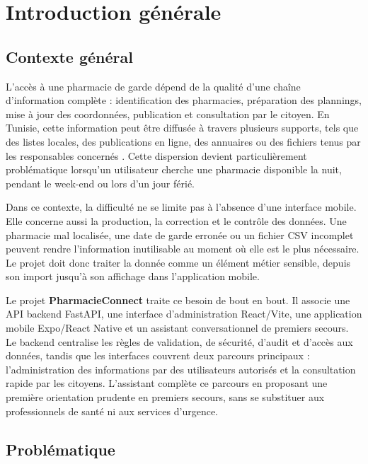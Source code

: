\chapter*{Introduction générale}

\section*{Contexte général}

L'accès à une pharmacie de garde dépend de la qualité d'une chaîne d'information complète : identification
des pharmacies, préparation des plannings, mise à jour des coordonnées, publication et consultation par le
citoyen. En Tunisie, cette information peut être diffusée à travers plusieurs supports, tels que des listes
locales, des publications en ligne, des annuaires ou des fichiers tenus par les responsables concernés
\cite{cnopt_tableau_garde,medtn,apothicare}. Cette dispersion devient particulièrement problématique lorsqu'un utilisateur cherche
une pharmacie disponible la nuit, pendant le week-end ou lors d'un jour férié.

Dans ce contexte, la difficulté ne se limite pas à l'absence d'une interface mobile. Elle concerne aussi la
production, la correction et le contrôle des données. Une pharmacie mal localisée, une date de garde
erronée ou un fichier CSV incomplet peuvent rendre l'information inutilisable au moment où elle est le plus
nécessaire. Le projet doit donc traiter la donnée comme un élément métier sensible, depuis son import
jusqu'à son affichage dans l'application mobile.

Le projet \textbf{PharmacieConnect} traite ce besoin de bout en bout. Il associe une
API backend FastAPI, une interface d'administration React/Vite, une application mobile Expo/React Native
et un assistant conversationnel de premiers secours. Le backend centralise les règles de validation, de
sécurité, d'audit et d'accès aux données, tandis que les interfaces couvrent deux parcours principaux :
l'administration des informations par des utilisateurs autorisés et la consultation rapide par les citoyens.
L'assistant complète ce parcours en proposant une première orientation prudente en premiers secours, sans se
substituer aux professionnels de santé ni aux services d'urgence.

\section*{Problématique}


